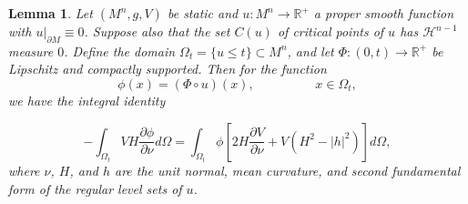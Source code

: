 \documentclass[12pt,twoside]{article}
\theoremstyle{plain}
\newtheorem{lemma}[theorem]{Lemma}
\theoremstyle{definition}
\theoremstyle{remark}
\numberwithin{equation}{section}
\begin{document}
\begin{lemma}
Let $(M^{n},g,V)$ be static and $u: M^{n} \rightarrow \mathbb{R}^{+}$ a proper smooth function with $u|_{\partial M} \equiv 0$. Suppose also that the set $C(u)$ of critical points of $u$ has $\mathcal{H}^{n-1}$ measure $0$. Define the domain $\Omega_{t} = \{ u \leq t \} \subset M^{n}$, and let $\Phi: (0,t) \rightarrow \mathbb{R}^{+}$ be Lipschitz and compactly supported. Then for the function
\begin{equation*}
    \phi(x) = (\Phi \circ u)(x), \hspace{2cm} x \in \Omega_{t},
\end{equation*}
 we have the integral identity

 \begin{equation} \label{integral_identity}
     - \int_{\Omega_{t}} V H \frac{\partial \phi}{\partial \nu} d\Omega = \int_{\Omega_{t}} \phi [2H \frac{\partial V}{\partial \nu} + V(H^{2} - |h|^{2})] d \Omega,
 \end{equation}
 where $\nu$, $H$, and $h$ are the unit normal, mean curvature, and second fundamental form of the regular level sets of $u$.
\end{lemma}
\end{document}
